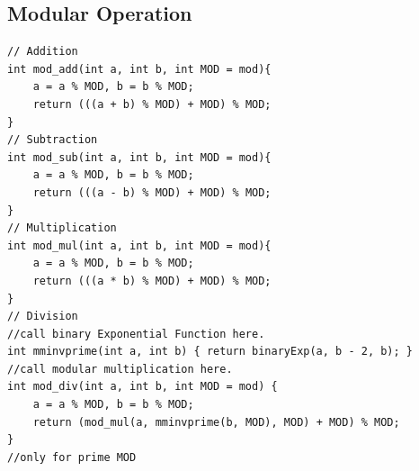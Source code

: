 \subsection{Modular Operation}
\begin{lstlisting}
// Addition
int mod_add(int a, int b, int MOD = mod){
    a = a % MOD, b = b % MOD;
    return (((a + b) % MOD) + MOD) % MOD;
}
// Subtraction
int mod_sub(int a, int b, int MOD = mod){
    a = a % MOD, b = b % MOD;
    return (((a - b) % MOD) + MOD) % MOD;
}
// Multiplication
int mod_mul(int a, int b, int MOD = mod){
    a = a % MOD, b = b % MOD;
    return (((a * b) % MOD) + MOD) % MOD;
}
// Division
//call binary Exponential Function here.
int mminvprime(int a, int b) { return binaryExp(a, b - 2, b); }
//call modular multiplication here.
int mod_div(int a, int b, int MOD = mod) {
    a = a % MOD, b = b % MOD;
    return (mod_mul(a, mminvprime(b, MOD), MOD) + MOD) % MOD;
}
//only for prime MOD
\end{lstlisting}
